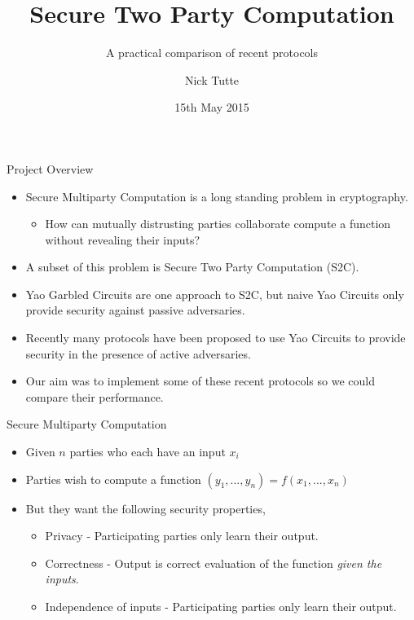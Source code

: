 \documentclass[t, 12pt]{beamer}            %
\title[Secure Two Party Computation]{Secure Two Party Computation}
\subtitle{A practical comparison of recent protocols}
\author{Nick Tutte}
\institute{University of Bristol}
\date{15th May 2015}
\begin{document}
\titlepage

\begin{frame}{Project Overview}
	\begin{itemize}[<+->]
		\item Secure Multiparty Computation is a long standing problem in cryptography.
		\begin{itemize}
			\item How can mutually distrusting parties collaborate compute a function without revealing their inputs?
		\end{itemize}
		\item A subset of this problem is Secure Two Party Computation (S2C).
		\item Yao Garbled Circuits are one approach to S2C, but naive Yao Circuits only provide security against passive adversaries. 
		\item Recently many protocols have been proposed to use Yao Circuits to provide security in the presence of active adversaries. 
		\item Our aim was to implement some of these recent protocols so we could compare their performance.
	\end{itemize}
\end{frame}

\begin{frame}{Secure Multiparty Computation}
	\begin{itemize}[<+->]
		\item Given $n$ parties who each have an input $x_i$
		\item Parties wish to compute a function $(y_1, ..., y_n) = f(x_1, ..., x_n)$
		\item But they want the following security properties,
		\begin{itemize}
			\item Privacy - Participating parties only learn their output.
			\item Correctness - Output is correct evaluation of the function \emph{given the inputs}.
			\item Independence of inputs - Participating parties only learn their output.
		\end{itemize}
	\end{itemize}
\end{frame}
\end{document}
